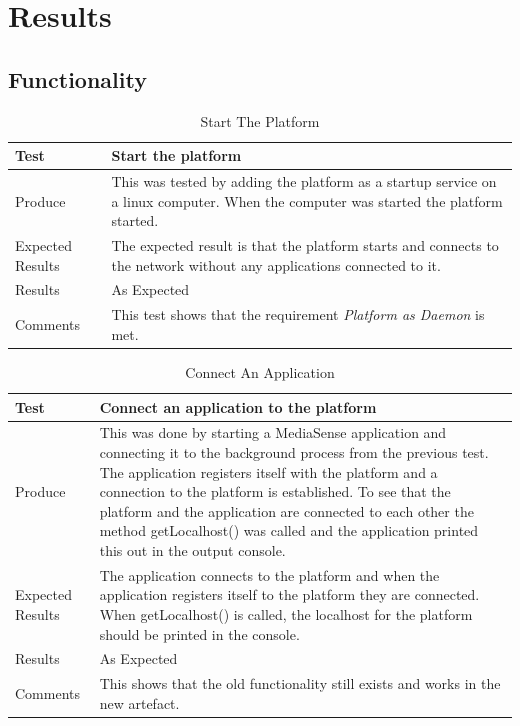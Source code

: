 \section{Results}
\subsection{Functionality}

\begin{table}[!h]
    \begin{tabular}{ | l | p{12cm} |}
    \hline
    Test 	 				& 		 Start the platform\\ \hline
	Produce  				& 		 This was tested by adding the platform as a startup service on a linux computer. When the computer was started the platform started.\\ \hline
	Expected Results  		& 		 The expected result is that the platform starts and connects to the network without any applications connected to it. \\ \hline
	Results 				& 		 As Expected\\ \hline
	Comments				& 		 This test shows that the requirement \emph{Platform as Daemon} is met.\\ \hline
    \end{tabular}
    \caption{Start The Platform}
\end{table}

\begin{table}[!h]
    \begin{tabular}{ | l | p{12cm} |}
    \hline
    Test 	 				& 		 Connect an application to the platform \\ \hline
	Produce  				& 		 This was done by starting a MediaSense application and connecting it to the background process from the previous test. The application registers itself with the platform and a connection to the platform is established. To see that the platform and the application are connected to each other the method getLocalhost() was called  and the application printed this out in the output console. \\ \hline
	Expected Results  		& 		 The application connects to the platform and when the application registers itself to the platform they are connected. When getLocalhost() is called, the localhost for the platform should be printed in the console. \\ \hline
	Results 				& 		 As Expected\\ \hline
	Comments				& 		 This shows that the old functionality still exists and works in the new artefact.\\ \hline
    \end{tabular}
    \caption{Connect An Application}
\end{table}

